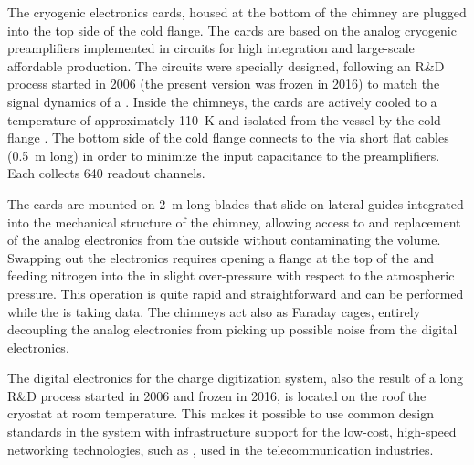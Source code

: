 The cryogenic  electronics cards, housed at the bottom of the chimney are plugged into the top side of  the cold flange. The  cards are based on the analog cryogenic preamplifiers implemented in   circuits for high integration and large-scale affordable production. 
The  circuits were specially designed, following an R\&D process started in 2006 (the present version was frozen in 2016) to match the signal dynamics of a . Inside the chimneys, the cards are actively cooled to a temperature of approximately \SI{110}{K} and isolated from the  vessel by the cold flange \fdth{}.  The bottom side of the cold flange connects to the  via short flat cables (\SI{0.5}{m} long) in order to minimize the input capacitance to the preamplifiers. Each  collects \num{640} readout channels. 

The  cards are mounted on \SI{2}{m} long blades that slide on lateral guides integrated into the mechanical structure of the chimney, allowing access to and replacement of the analog  electronics from the outside without contaminating the  volume. 
Swapping out the  electronics requires opening a flange at the top of the  and feeding nitrogen into the  in slight over-pressure with respect to the atmospheric pressure.  This operation is quite rapid and straightforward and can be performed while the  is taking data. The chimneys act also as Faraday cages, entirely decoupling the analog  electronics  from picking up possible noise from the digital electronics.   

The digital electronics for the charge digitization system, also the result of a long R\&D process started in 2006 and frozen in 2016, is located 
on the roof the cryostat at room temperature. %
This makes it possible to use common design standards in the system with infrastructure support for the low-cost, high-speed networking technologies, such as , used in the telecommunication industries.

